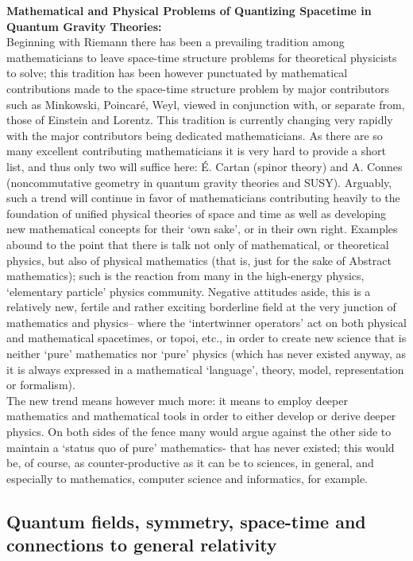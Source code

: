 \documentclass[12pt]{article}
\theoremstyle{plain}
\theoremstyle{definition}
\numberwithin{equation}{section}
\begin{document}
\textbf{Mathematical and Physical Problems of Quantizing Spacetime in Quantum Gravity Theories:} \\


Beginning with Riemann there has been a prevailing tradition among mathematicians to leave space-time structure
problems for theoretical physicists to solve; this tradition has been however punctuated by 
mathematical contributions made to the space-time structure problem by major contributors such as 
Minkowski, Poincar\'e, Weyl, viewed in conjunction with, or separate from, those of Einstein and Lorentz.
This tradition is currently changing very rapidly with the major contributors being dedicated mathematicians.
As there are so many excellent contributing mathematicians it is very hard to provide a short list, and thus
only two will suffice here: \'E. Cartan (spinor theory) and A. Connes (noncommutative geometry in 
quantum gravity theories and SUSY). Arguably, such a trend will continue in favor of mathematicians contributing heavily to the foundation of unified physical theories of space and time as well as developing new mathematical concepts for their `own sake', or in their own right. Examples abound to the point that there is talk not only of mathematical, or theoretical physics, but also of physical mathematics (that is, just for the sake of Abstract mathematics); such is the reaction from many in the high-energy physics, `elementary particle' physics community. Negative attitudes aside, this is a relatively new, fertile and rather exciting borderline field at the very junction of mathematics and physics-- where the `intertwinner operators' act on both physical and mathematical spacetimes, or topoi, etc., in order to create new science that is neither `pure' mathematics nor `pure' physics (which has never existed anyway, as it is always expressed in a mathematical `language', theory, model, representation or formalism). \\

The new trend means however much more: it means to employ deeper mathematics and mathematical tools in order to either develop or derive deeper physics. On both sides of the fence many would argue against the other side to maintain a `status quo of pure' mathematics- that has never existed; this would be, of course, as counter-productive as it can be to sciences, in general, and especially to mathematics, computer science and informatics, for example.
\subsection {Quantum fields, symmetry, space-time and connections to general relativity} 
\end{document}

